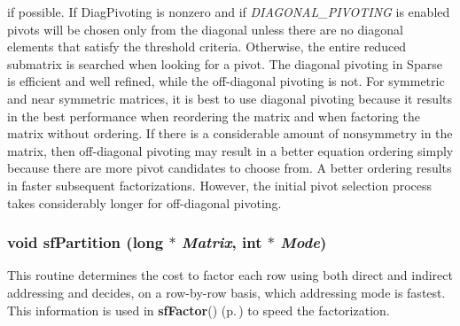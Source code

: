 \begin{Desc}
if possible. If Diag\-Pivoting is nonzero and if {\em DIAGONAL\_\-PIVOTING} is enabled pivots will be chosen only from the diagonal unless there are no diagonal elements that satisfy the threshold criteria. Otherwise, the entire reduced submatrix is searched when looking for a pivot. The diagonal pivoting in Sparse is efficient and well refined, while the off-diagonal pivoting is not. For symmetric and near symmetric matrices, it is best to use diagonal pivoting because it results in the best performance when reordering the matrix and when factoring the matrix without ordering. If there is a considerable amount of nonsymmetry in the matrix, then off-diagonal pivoting may result in a better equation ordering simply because there are more pivot candidates to choose from. A better ordering results in faster subsequent factorizations. However, the initial pivot selection process takes considerably longer for off-diagonal pivoting. \end{Desc}
\subsubsection{\setlength{\rightskip}{0pt plus 5cm}void sf\-Partition (long $\ast$ {\em Matrix}, int $\ast$ {\em Mode})}\label{spFortran_8c_a63}


This routine determines the cost to factor each row using both direct and indirect addressing and decides, on a row-by-row basis, which addressing mode is fastest. This information is used in {\bf sf\-Factor}() {\rm (p.\,\pageref{spFortran_8c_a62})} to speed the factorization.

